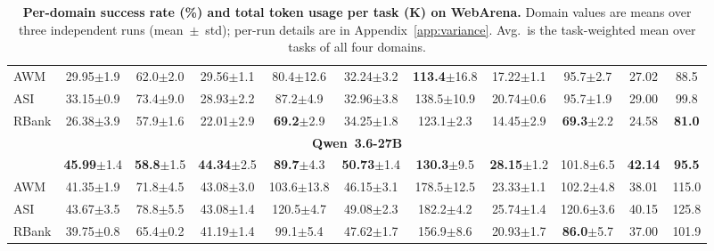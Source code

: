 \begin{table}[t]
{\begin{tabular}{lcccccccccc}
AWM       & 29.95{\scriptsize $\pm$1.9} & 62.0{\scriptsize $\pm$2.0}  & 29.56{\scriptsize $\pm$1.1} & 80.4{\scriptsize $\pm$12.6} & 32.24{\scriptsize $\pm$3.2} & \textbf{113.4}{\scriptsize $\pm$16.8} & 17.22{\scriptsize $\pm$1.1} & 95.7{\scriptsize $\pm$2.7}  & 27.02 & 88.5 \\
ASI       & 33.15{\scriptsize $\pm$0.9} & 73.4{\scriptsize $\pm$9.0}  & 28.93{\scriptsize $\pm$2.2} & 87.2{\scriptsize $\pm$4.9}  & 32.96{\scriptsize $\pm$3.8} & 138.5{\scriptsize $\pm$10.9} & 20.74{\scriptsize $\pm$0.6} & 95.7{\scriptsize $\pm$1.9}  & 29.00 & 99.8 \\
RBank     & 26.38{\scriptsize $\pm$3.9} & 57.9{\scriptsize $\pm$1.6}  & 22.01{\scriptsize $\pm$2.9} & \textbf{69.2}{\scriptsize $\pm$2.9}  & 34.25{\scriptsize $\pm$1.8} & 123.1{\scriptsize $\pm$2.3}  & 14.45{\scriptsize $\pm$2.9} & \textbf{69.3}{\scriptsize $\pm$2.2}  & 24.58 & \textbf{81.0} \\
\midrule
\multicolumn{11}{c}{\textbf{Qwen~3.6-27B}} \\
\midrule
\budgetactor{} & \textbf{45.99}{\scriptsize $\pm$1.4} & \textbf{58.8}{\scriptsize $\pm$1.5}  & \textbf{44.34}{\scriptsize $\pm$2.5} & \textbf{89.7}{\scriptsize $\pm$4.3}  & \textbf{50.73}{\scriptsize $\pm$1.4} & \textbf{130.3}{\scriptsize $\pm$9.5}  & \textbf{28.15}{\scriptsize $\pm$1.2} & 101.8{\scriptsize $\pm$6.5}  & \textbf{42.14} & \textbf{95.5} \\
AWM       & 41.35{\scriptsize $\pm$1.9} & 71.8{\scriptsize $\pm$4.5}  & 43.08{\scriptsize $\pm$3.0} & 103.6{\scriptsize $\pm$13.8} & 46.15{\scriptsize $\pm$3.1} & 178.5{\scriptsize $\pm$12.5} & 23.33{\scriptsize $\pm$1.1} & 102.2{\scriptsize $\pm$4.8} & 38.01 & 115.0 \\
ASI       & 43.67{\scriptsize $\pm$3.5} & 78.8{\scriptsize $\pm$5.5}  & 43.08{\scriptsize $\pm$1.4} & 120.5{\scriptsize $\pm$4.7}  & 49.08{\scriptsize $\pm$2.3} & 182.2{\scriptsize $\pm$4.2}  & 25.74{\scriptsize $\pm$1.4} & 120.6{\scriptsize $\pm$3.6} & 40.15 & 125.8 \\
RBank     & 39.75{\scriptsize $\pm$0.8} & 65.4{\scriptsize $\pm$0.2}  & 41.19{\scriptsize $\pm$1.4} & 99.1{\scriptsize $\pm$5.4}  & 47.62{\scriptsize $\pm$1.7} & 156.9{\scriptsize $\pm$8.6}  & 20.93{\scriptsize $\pm$1.7} & \textbf{86.0}{\scriptsize $\pm$5.7}  & 37.00 & 101.9 \\
\bottomrule
\end{tabular}
}
\caption{\textbf{Per-domain success rate (\%) and total token usage per task (K) on WebArena.}
Domain values are means over three independent runs (mean~$\pm$~{\scriptsize std}); per-run details are in Appendix~\ref{app:variance}. Avg.\ is the task-weighted mean over tasks of all four domains.
}
\label{tab:main}
\end{table}

